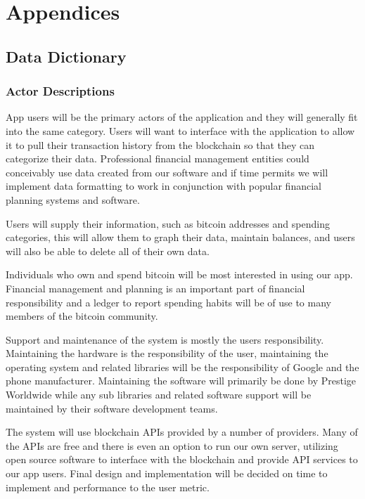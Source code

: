 \renewcommand\thefigure{\thesection.\arabic{figure}}   

\clearpage
\section{Appendices}
  \subsection{Data Dictionary}
    \subsubsection{Actor Descriptions}

App users will be the primary actors of the application and they will generally fit into the same category. Users will want to interface with the application to allow it to pull their transaction history from the blockchain so that they can categorize their data. Professional financial management entities could conceivably use data created from our software and if time permits we will implement data formatting to work in conjunction with popular financial planning systems and software. 

Users will supply their information, such as bitcoin addresses and spending categories, this will allow them to graph their data, maintain balances, and users will also be able to delete all of their own data. 

Individuals who own and spend bitcoin will be most interested in using our app. Financial management and planning is an important part of financial responsibility and a ledger to report spending habits will be of use to many members of the bitcoin community.

Support and maintenance of the system is mostly the users responsibility. Maintaining the hardware is the responsibility of the user, maintaining the operating system and related libraries will be the responsibility of Google and the phone manufacturer. Maintaining the software will primarily be done by Prestige Worldwide while any sub libraries and related software support will be maintained by their software development teams.

The system will use blockchain APIs provided by a number of providers. Many of the APIs are free and there is even an option to run our own server, utilizing open source software to interface with the blockchain and provide API services to our app users. Final design and implementation will be decided on time to implement and performance to the user metric.


